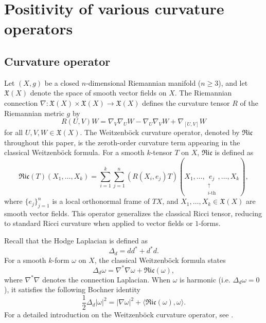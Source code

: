 \documentclass[12pt, twoside]{article}
\theoremstyle{definition}
\numberwithin{equation}{section}
\begin{document}
\section{Positivity of various curvature operators}
\subsection{Curvature operator}
Let $(X,g)$ be a closed $n$-dimensional Riemannian manifold ($n \geq 3$), and let $\mathfrak{X}(X)$ denote the space of smooth vector fields on $X$. The Riemannian connection $\nabla : \mathfrak{X}(X) \times \mathfrak{X}(X) \to \mathfrak{X}(X)$ defines the curvature tensor $R$ of the Riemannian metric $g$ by
$$
R(U,V)W = \nabla_V \nabla_U W - \nabla_U \nabla_V W + \nabla_{[U,V]} W
$$
for all $U,V,W \in \mathfrak{X}(X)$. The Weitzenb\"{o}ck curvature operator, denoted by $\mathfrak{Ric}$ throughout this paper, is the zeroth-order curvature term appearing in the classical Weitzenb\"ock formula. For a smooth $k$-tensor $T$ on $X$, $\mathfrak{Ric}$ is defined as
\[
\mathfrak{Ric}(T)(X_{1},\dots,X_{k}) = \sum_{i=1}^{k} \sum_{j=1}^{n} \left( R(X_{i}, e_{j}) T \right)(X_{1}, \dots, \underset{\substack{\uparrow \\ i\text{-th}}}{e_j}, \dots, X_{k}),
\]
where $\{e_j\}_{j=1}^n$ is a local orthonormal frame of $TX$, and $X_1, \dots, X_k \in \mathfrak{X}(X)$ are smooth vector fields. This operator generalizes the classical Ricci tensor, reducing to standard Ricci curvature when applied to vector fields or $1$-forms.
 
Recall that the Hodge Laplacian is defined as 
\[
\Delta_{d} = d d^* + d^* d.
\]
For a smooth $k$-form $\omega$ on $X$, the classical Weitzenb\"ock formula states
\[
\Delta_{d} \omega = \nabla^* \nabla \omega + \mathfrak{Ric}(\omega),
\]
where $\nabla^* \nabla$ denotes the connection Laplacian. When $\omega$ is harmonic (i.e. $\Delta_{d} \omega = 0$), it satisfies the following Bochner identity 
\begin{equation}
\frac{1}{2} \Delta_{d} |\omega|^2 = |\nabla \omega|^2 + \langle \mathfrak{Ric}(\omega), \omega \rangle.
\end{equation}
For a detailed introduction on the Weitzenb\"ock curvature operator, see \cite[Chapter 9]{Pet16}.
\end{document}
